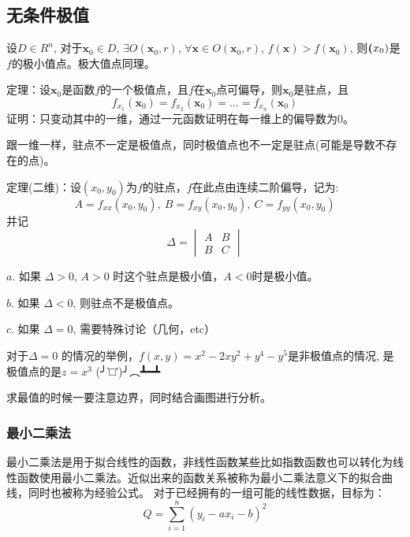\documentclass[10pt, a4paper]{article}
\begin{document}
        \subsection{无条件极值}
            设$D\in R^n$, 对于$\textbf{x}_0 \in D$, $\exists O(\textbf{x}_0, r)$, $\forall \textbf{x} \in O(\textbf{x}_0, r)$, $f(\textbf{x}) > f(\textbf{x}_0)$, 则$\textbf({x}_0)$是$f$的极小值点。极大值点同理。

            定理：设$\textbf{x}_0$是函数$f$的一个极值点，且$f$在$\textbf{x}_0$点可偏导，则$\textbf{x}_0$是驻点，且
            $$f_{x_1}(\textbf{x}_0) = f_{x_2}(\textbf{x}_0) = ... = f_{x_n}(\textbf{x}_0)$$
            证明：只变动其中的一维，通过一元函数证明在每一维上的偏导数为0。

            跟一维一样，驻点不一定是极值点，同时极值点也不一定是驻点(可能是导数不存在的点)。
            \newline

            定理(二维)：设$(x_0, y_0)$为$f$的驻点，$f$在此点由连续二阶偏导，记为:
                $$A = f_{xx}(x_0, y_0),\ B = f_{xy}(x_0, y_0),\ C = f_{yy}(x_0, y_0)$$
                并记
                \begin{equation*}
                    \Delta = 
                    \begin{vmatrix}
                        A & B \\
                        B & C
                    \end{vmatrix}
                \end{equation*}

                $a$. 如果 $\Delta > 0$, $A > 0$ 时这个驻点是极小值，$A < 0$时是极小值。

                $b$. 如果 $\Delta < 0$, 则驻点不是极值点。
                
                $c$. 如果 $\Delta = 0$, 需要特殊讨论（几何，etc）
            
                对于$\Delta = 0$ 的情况的举例，$f(x, y) = x ^ 2 - 2xy^2 + y^4 - y^5$是非极值点的情况, 是极值点的是$z = x^3$  (╯‵□′)╯︵┻━┻
            \newline 

            求最值的时候一要注意边界，同时结合画图进行分析。
            
            \subsubsection{最小二乘法}
                最小二乘法是用于拟合线性的函数，非线性函数某些比如指数函数也可以转化为线性函数使用最小二乘法。近似出来的函数关系被称为最小二乘法意义下的拟合曲线，同时也被称为经验公式。 对于已经拥有的一组可能的线性数据，目标为：
                $$Q = \sum_{i = 1}^{n}(y_i - ax_i - b)^2$$
                
\end{document}
